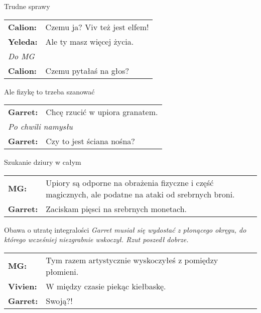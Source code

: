 \documentclass[10pt,twoside,twocolumn]{book}
\begin{document}
\begin{rpg-quotebox}{Trudne sprawy}
   \begin{tabularx}{\columnwidth}{lX}
      \textbf{Calion:} & Czemu ja? Viv też jest elfem!\\
      \textbf{Yeleda:} & Ale ty masz więcej życia.\\
      \multicolumn{2}{l}{\textit{Do MG}}\\
      \textbf{Calion:} & Czemu pytałaś na głos?\\
   \end{tabularx}
\end{rpg-quotebox}

\begin{rpg-quotebox}{Ale fizykę to trzeba szanować}
   \begin{tabularx}{\columnwidth}{lX}
      \textbf{Garret:} & Chcę rzucić w upiora granatem.\\
      \multicolumn{2}{l}{\textit{Po chwili namysłu}}\\
      \textbf{Garret:} & Czy to jest ściana nośna?\\
   \end{tabularx}
\end{rpg-quotebox}

\begin{rpg-quotebox}{Szukanie dziury w całym}
   \begin{tabularx}{\columnwidth}{lX}
      \textbf{MG:} & Upiory są odporne na obrażenia fizyczne i część magicznych, ale podatne na ataki od srebrnych broni.\\
      \textbf{Garret:} & Zaciskam pięsci na srebrnych monetach.\\
   \end{tabularx}
\end{rpg-quotebox}

\begin{rpg-quotebox}{Obawa o utratę integralości}
   \textit{Garret musiał się wydostać z płonącego okręgu, do którego wcześniej niezgrabnie wskoczył. Rzut poszedł dobrze.}

   \begin{tabularx}{\columnwidth}{lX}
      \textbf{MG:} & Tym razem artystycznie wyskoczyłeś z pomiędzy płomieni.\\
      \textbf{Vivien:} & W między czasie piekąc kiełbaskę.\\
      \textbf{Garret:} & Swoją?!\\
   \end{tabularx}
\end{rpg-quotebox}
\end{document}
